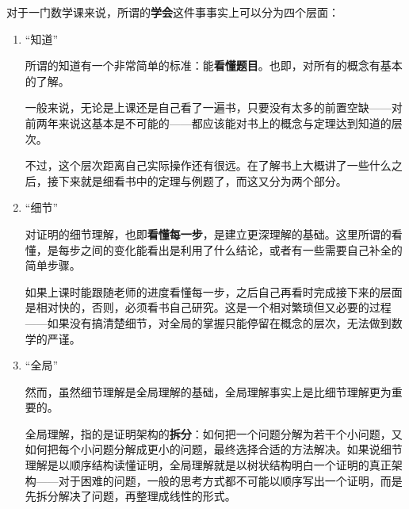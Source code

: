 \documentclass[a4paper,UTF8,fontset=windows]{ctexart}
\begin{document}
对于一门数学课来说，所谓的\textbf{学会}这件事事实上可以分为四个层面：
\begin{enumerate}
    \item ``知道''
    
    所谓的知道有一个非常简单的标准：能\textbf{看懂题目}。也即，对所有的概念有基本的了解。

    一般来说，无论是上课还是自己看了一遍书，只要没有太多的前置空缺——对前两年来说这基本是不可能的——都应该能对书上的概念与定理达到知道的层次。

    不过，这个层次距离自己实际操作还有很远。在了解书上大概讲了一些什么之后，接下来就是细看书中的定理与例题了，而这又分为两个部分。

    \item ``细节''
    
    对证明的细节理解，也即\textbf{看懂每一步}，是建立更深理解的基础。这里所谓的看懂，是每步之间的变化能看出是利用了什么结论，或者有一些需要自己补全的简单步骤。

    如果上课时能跟随老师的进度看懂每一步，之后自己再看时完成接下来的层面是相对快的，否则，必须看书自己研究。这是一个相对繁琐但又必要的过程——如果没有搞清楚细节，对全局的掌握只能停留在概念的层次，无法做到数学的严谨。

    \item ``全局''
    
    然而，虽然细节理解是全局理解的基础，全局理解事实上是比细节理解更为重要的。

    全局理解，指的是证明架构的\textbf{拆分}：如何把一个问题分解为若干个小问题，又如何把每个小问题分解成更小的问题，最终选择合适的方法解决。如果说细节理解是以顺序结构读懂证明，全局理解就是以树状结构明白一个证明的真正架构——对于困难的问题，一般的思考方式都不可能以顺序写出一个证明，而是先拆分解决了问题，再整理成线性的形式。


\end{enumerate}
\end{document}
